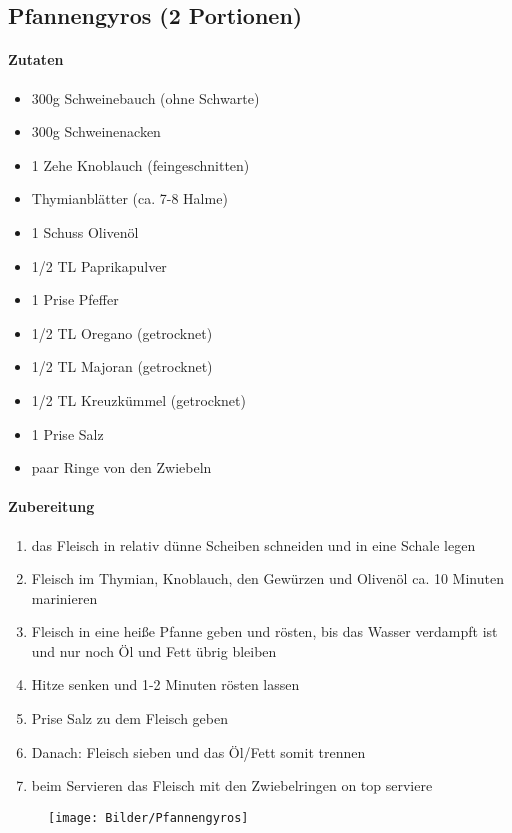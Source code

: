 \newpage
\subsection{Pfannengyros (2 Portionen)}
\paragraph{Zutaten}
\begin{itemize}[noitemsep]
	\item 300g Schweinebauch (ohne Schwarte)
	\item 300g Schweinenacken
	\item 1 Zehe Knoblauch (feingeschnitten)
	\item Thymianblätter (ca. 7-8 Halme)
	\item 1 Schuss Olivenöl
	\item 1/2 TL Paprikapulver
	\item 1 Prise Pfeffer
	\item 1/2 TL Oregano (getrocknet)
	\item 1/2 TL Majoran (getrocknet)
	\item 1/2 TL Kreuzkümmel (getrocknet)
	\item 1 Prise Salz
	\item paar Ringe von den Zwiebeln
\end{itemize}
\paragraph{Zubereitung}
\begin{enumerate}[noitemsep]
	\item das Fleisch in relativ dünne Scheiben schneiden und in eine Schale legen
	\item Fleisch im Thymian, Knoblauch, den Gewürzen und Olivenöl ca. 10 Minuten marinieren
	\item Fleisch in eine heiße Pfanne geben und rösten, bis das Wasser verdampft ist und nur noch Öl und Fett übrig bleiben 
	\item Hitze senken und 1-2 Minuten rösten lassen
	\item Prise Salz zu dem Fleisch geben 
	\item Danach: Fleisch sieben und das Öl/Fett somit trennen 
	\item beim Servieren das Fleisch mit den Zwiebelringen on top serviere
\end{enumerate}
\begin{figure}[h]
\centering
\texttt{[image: Bilder/Pfannengyros]}
\end{figure}